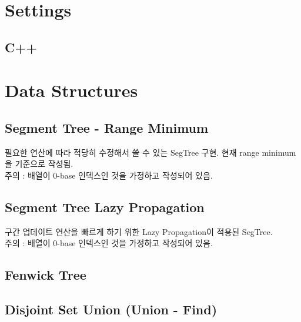\documentclass[landscape,8pt]{article}
\begin{document}
\newpage
\maketitle
\begin{multicols}{3}\raggedcolumns
\tableofcontents
\end{multicols}
\pagebreak
\begin{multicols}{2}\raggedcolumns


\section{Settings}

  \subsection{C++}

\section{Data Structures}
  \subsection{Segment Tree - Range Minimum}
     필요한 연산에 따라 적당히 수정해서 쓸 수 있는 SegTree 구현. 현재 range minimum을 기준으로 작성됨.\\
     주의 : 배열이 0-base 인덱스인 것을 가정하고 작성되어 있음.
     

  \subsection{Segment Tree Lazy Propagation}
     구간 업데이트 연산을 빠르게 하기 위한 Lazy Propagation이 적용된 SegTree.\\
     주의 : 배열이 0-base 인덱스인 것을 가정하고 작성되어 있음.
     
  \subsection{Fenwick Tree}
    
\pagebreak
  \subsection{Disjoint Set Union (Union - Find)}
    


\end{multicols}
\end{document}
